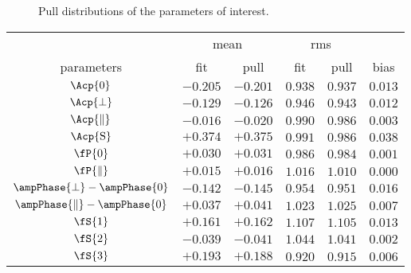 \begin{figure}[!t]
  \centering
  \begin{subfigure}{0.5\textwidth}
    \scalebox{0.57}{}
    \caption{}
    \label{pull_ASMag2_bin4}
  \end{subfigure}%
  \hfill%
  \begin{subfigure}{0.5\textwidth}
    \scalebox{0.57}{}
    \caption{}
    \label{pull_ASPhase_bin4}
  \end{subfigure}
\caption{Pull distributions of the \swave parameters of interest.}
\label{pull_swave}
\end{figure}

\begin{table}[!h]
  \centering
  \footnotesize
  \begin{tabular}{c c c c c | c}
    \cline{2-5}
               & \multicolumn{2}{c}{mean} & \multicolumn{2}{c}{rms} &  \\
    \cline{2-6}
    parameters & fit & pull & fit & pull & bias \\
    \cline{1-6}
    $                  \Acp{0}$ & $-0.205$ & $-0.201$ & $0.938$ & $0.937$  & $0.013$ \\
    $              \Acp{\perp}$ & $-0.129$ & $-0.126$ & $0.946$ & $0.943$  & $0.012$ \\
    $          \Acp{\parallel}$ & $-0.016$ & $-0.020$ & $0.990$ & $0.986$  & $0.003$ \\
    $                  \Acp{\rm S}$ & $+0.374$ & $+0.375$ & $0.991$ & $0.986$  & $0.038$ \\
    \hline
    $                   \fP{0}$ & $+0.030$ & $+0.031$ & $0.986$ & $0.984$  & $0.001$ \\
    $           \fP{\parallel}$ & $+0.015$ & $+0.016$ & $1.016$ & $1.010$  & $0.000$ \\
    $         \ampPhase{\perp}-\ampPhase{0}$ & $-0.142$ & $-0.145$ & $0.954$ & $0.951$  & $0.016$ \\
    $     \ampPhase{\parallel}-\ampPhase{0}$ & $+0.037$ & $+0.041$ & $1.023$ & $1.025$  & $0.007$ \\
    \hline
    $                   \fS{1}$ & $+0.161$ & $+0.162$ & $1.107$ & $1.105$  & $0.013$ \\
    $                   \fS{2}$ & $-0.039$ & $-0.041$ & $1.044$ & $1.041$  & $0.002$ \\
    $                   \fS{3}$ & $+0.193$ & $+0.188$ & $0.920$ & $0.915$  & $0.006$ \\

\end{tabular}
\end{table}
